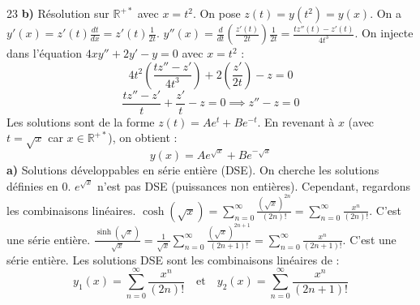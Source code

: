 \begin{correction}{23}
\textbf{b)} Résolution sur $\mathbb{R}^{+*}$ avec $x=t^2$. 
On pose $z(t) = y(t^2) = y(x)$. 
On a $y'(x) = z'(t) \frac{dt}{dx} = z'(t) \frac{1}{2t}$. 
$y''(x) = \frac{d}{dt}\left(\frac{z'(t)}{2t}\right) \frac{1}{2t} = \frac{t z''(t) - z'(t)}{4t^3}$. 
On injecte dans l'équation $4xy'' + 2y' - y = 0$ avec $x=t^2$ : 
$$ 4t^2 \left( \frac{t z'' - z'}{4t^3} \right) + 2 \left( \frac{z'}{2t} \right) - z = 0 $$ 
$$ \frac{t z'' - z'}{t} + \frac{z'}{t} - z = 0 \implies z'' - z = 0 $$ 
Les solutions sont de la forme $z(t) = A e^t + B e^{-t}$. 
En revenant à $x$ (avec $t = \sqrt{x}$ car $x \in \mathbb{R}^{+*}$), on obtient : 
$$ y(x) = A e^{\sqrt{x}} + B e^{-\sqrt{x}} $$ 
\textbf{a)} Solutions développables en série entière (DSE). 
On cherche les solutions définies en 0. 
$e^{\sqrt{x}}$ n'est pas DSE (puissances non entières). Cependant, regardons les combinaisons linéaires. 
$\cosh(\sqrt{x}) = \sum_{n=0}^\infty \frac{(\sqrt{x})^{2n}}{(2n)!} = \sum_{n=0}^\infty \frac{x^n}{(2n)!}$. C'est une série entière. 
$\frac{\sinh(\sqrt{x})}{\sqrt{x}} = \frac{1}{\sqrt{x}} \sum_{n=0}^\infty \frac{(\sqrt{x})^{2n+1}}{(2n+1)!} = \sum_{n=0}^\infty \frac{x^n}{(2n+1)!}$. C'est une série entière. 
Les solutions DSE sont les combinaisons linéaires de : 
$$ y_1(x) = \sum_{n=0}^\infty \frac{x^n}{(2n)!} \quad \text{et} \quad y_2(x) = \sum_{n=0}^\infty \frac{x^n}{(2n+1)!} $$ 
\end{correction}

